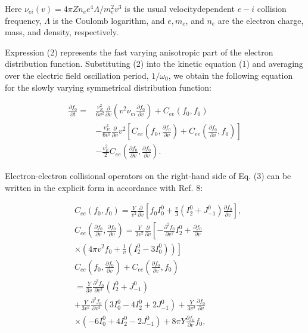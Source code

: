 \documentclass[oneside,onecolumn]{article}
\begin{document}
\begin{sloppypar}
 Here $\nu_{e i}(v)=4 \pi Z n_{e} e^{4} \Lambda / m_{e}^{2} v^{3}$ is the usual velocitydependent $e-i$ collision frequency, $\Lambda$ is the Coulomb logarithm, and $e, m_{e}$, and $n_{e}$ are the electron charge, mass, and density, respectively.
 
 Expression (2) represents the fast varying anisotropic part of the electron distribution function. Substituting (2) into the kinetic equation (1) and averaging over the electric field oscillation period, $1 / \omega_{0}$, we obtain the following equation for the slowly varying symmetrical distribution function:
 
 \begin{dmath}[compact]
 \begin{aligned}
 \frac{\partial f_{0}}{\partial t}= & \frac{v_{E}^{2}}{6 v^{2}} \frac{\partial}{\partial v}\left(v^{2} \nu_{e i} \frac{\partial f_{0}}{\partial v}\right)+C_{e e}\left(f_{0}, f_{0}\right) \\
 & -\frac{v_{E}^{2}}{6 v^{2}} \frac{\partial}{\partial v} v^{2}\left[C_{e e}\left(f_{0}, \frac{\partial f_{0}}{\partial v}\right)+C_{e e}\left(\frac{\partial f_{0}}{\partial v}, f_{0}\right)\right] \\
 & -\frac{v_{E}^{2}}{2} C_{e e}\left(\frac{\partial f_{0}}{\partial v}, \frac{\partial f_{0}}{\partial v}\right) .
 \end{aligned}
 \end{dmath}
 
 Electron-electron collisional operators on the right-hand side of Eq. (3) can be written in the explicit form in accordance with Ref. 8:
 
 \begin{dmath}[compact]
 \begin{aligned}
 & C_{e e}\left(f_{0}, f_{0}\right)=\frac{Y}{v^{2}} \frac{\partial}{\partial v}\left[f_{0} I_{0}^{0}+\frac{v}{3}\left(I_{2}^{0}+J_{-1}^{0}\right) \frac{\partial f_{0}}{\partial v}\right], \\
 & C_{e e}\left(\frac{\partial f_{0}}{\partial v}, \frac{\partial f_{0}}{\partial v}\right)=\frac{Y}{3 v^{2}} \frac{\partial}{\partial v}\left[-\frac{\partial^{2} f_{0}}{\partial v^{2}} I_{2}^{0}+\frac{\partial f_{0}}{\partial v}\right. \\
 & \left.\times\left(4 \pi v^{2} f_{0}+\frac{1}{v}\left(I_{2}^{0}-3 I_{0}^{0}\right)\right)\right] \\
 & C_{e e}\left(f_{0}, \frac{\partial f_{0}}{\partial v}\right)+C_{e e}\left(\frac{\partial f_{0}}{\partial v}, f_{0}\right) \\
 & =\frac{Y}{3 v} \frac{\partial^{3} f_{0}}{\partial v^{3}}\left(I_{2}^{0}+J_{-1}^{0}\right) \\
 & +\frac{Y}{3 v^{2}} \frac{\partial^{2} f_{0}}{\partial v^{2}}\left(3 I_{0}^{0}-4 I_{2}^{0}+2 J_{-1}^{0}\right)+\frac{Y}{3 v^{3}} \frac{\partial f_{0}}{\partial v} \\
 & \times\left(-6 I_{0}^{0}+4 I_{2}^{0}-2 J_{-1}^{0}\right)+8 \pi Y \frac{\partial f_{0}}{\partial v} f_{0},
 \end{aligned}
 \end{dmath}
 

\end{sloppypar}
\end{document}
